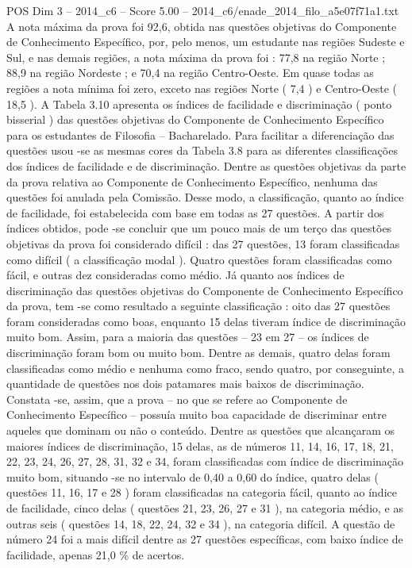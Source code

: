 \begin{textsample}{POS Dim 3 – 2014\_c6 – Score 5.00 – 2014\_c6/enade\_2014\_filo\_a5e07f71a1.txt}
A nota máxima da prova foi 92,6, obtida nas questões objetivas do Componente de Conhecimento Específico, por, pelo menos, um estudante nas regiões Sudeste e Sul, e nas demais regiões, a nota máxima da prova foi : 77,8 na região Norte ; 88,9 na região Nordeste ; e 70,4 na região Centro-Oeste.
Em quase todas as regiões a nota mínima foi zero, exceto nas regiões Norte ( 7,4 ) e Centro-Oeste ( 18,5 ).
A Tabela 3.10 apresenta os índices de facilidade e discriminação ( ponto bisserial ) das questões objetivas do Componente de Conhecimento Específico para os estudantes de Filosofia – Bacharelado.
Para facilitar a diferenciação das questões usou -se as mesmas cores da Tabela 3.8 para as diferentes classificações dos índices de facilidade e de discriminação.
Dentre as questões objetivas da parte da prova relativa ao Componente de Conhecimento Específico, nenhuma das questões foi anulada pela Comissão.
Desse modo, a classificação, quanto ao índice de facilidade, foi estabelecida com base em todas as 27 questões.
A partir dos índices obtidos, pode -se concluir que um pouco mais de um terço das questões objetivas da prova foi considerado difícil : das 27 questões, 13 foram classificadas como difícil ( a classificação modal ).
Quatro questões foram classificadas como fácil, e outras dez consideradas como médio.
Já quanto aos índices de discriminação das questões objetivas do Componente de Conhecimento Específico da prova, tem -se como resultado a seguinte classificação : oito das 27 questões foram consideradas como boas, enquanto 15 delas tiveram índice de discriminação muito bom.
Assim, para a maioria das questões – 23 em 27 – os índices de discriminação foram bom ou muito bom.
Dentre as demais, quatro delas foram classificadas como médio e nenhuma como fraco, sendo quatro, por conseguinte, a quantidade de questões nos dois patamares mais baixos de discriminação.
Constata -se, assim, que a prova – no que se refere ao Componente de Conhecimento Específico – possuía muito boa capacidade de discriminar entre aqueles que dominam ou não o conteúdo.
Dentre as questões que alcançaram os maiores índices de discriminação, 15 delas, as de números 11, 14, 16, 17, 18, 21, 22, 23, 24, 26, 27, 28, 31, 32 e 34, foram classificadas com índice de discriminação muito bom, situando -se no intervalo de 0,40 a 0,60 do índice, quatro delas ( questões 11, 16, 17 e 28 ) foram classificadas na categoria fácil, quanto ao índice de facilidade, cinco delas ( questões 21, 23, 26, 27 e 31 ), na categoria médio, e as outras seis ( questões 14, 18, 22, 24, 32 e 34 ), na categoria difícil.
A questão de número 24 foi a mais difícil dentre as 27 questões específicas, com baixo índice de facilidade, apenas 21,0 \% de acertos.

\end{textsample}
